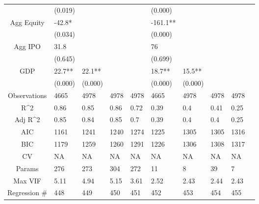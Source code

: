 \documentclass{article}
\begin{document}
\begin{table}[H]
\begin{tabular}{|clllllllll|}
   & (0.019) &  &  &  & (0.000) &  &  &  & \\
  Agg Equity & -42.8* &  &  &  & -161.1** &  &  &  & \\
   & (0.034) &  &  &  & (0.000) &  &  &  & \\
  Agg IPO & 31.8 &  &  &  & 76 &  &  &  & \\
   & (0.645) &  &  &  & (0.699) &  &  &  & \\
  GDP & 22.7** & 22.1** &  &  & 18.7** & 15.5** &  &  & \\
   & (0.000) & (0.000) &  &  & (0.000) & (0.000) &  &  & \\
  \hline
 Observations & 4665 & 4978 & 4978 & 4978 & 4665 & 4978 & 4978 & 4978 & \\
  R^2 & 0.86 & 0.85 & 0.86 & 0.72 & 0.39 & 0.4 & 0.41 & 0.25 & \\
  Adj R^2 & 0.85 & 0.84 & 0.85 & 0.7 & 0.39 & 0.4 & 0.4 & 0.25 & \\
  AIC & 1161 & 1241 & 1240 & 1274 & 1225 & 1305 & 1305 & 1316 & \\
  BIC & 1179 & 1259 & 1260 & 1291 & 1226 & 1306 & 1308 & 1317 & \\
  CV & NA & NA & NA & NA & NA & NA & NA & NA & \\
  Params & 276 & 273 & 304 & 272 & 11 & 8 & 39 & 7 & \\
  Max VIF & 5.11 & 4.94 & 5.15 & 3.61 & 2.52 & 2.43 & 2.44 & 2.43 & \\
  Regression \# & 448 & 449 & 450 & 451 & 452 & 453 & 454 & 455 & \\
   \hline
\end{tabular}

\end{table}
\end{document}
